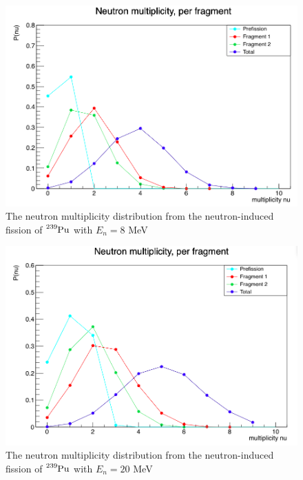 \documentclass[]{article}
\begin{document}
\begin{figure} [H]
	\centering
	\includegraphics[scale=0.36]{Pu239_8_n_mult.png}
	\caption{The neutron multiplicity distribution from the neutron-induced fission of $\ce{^{239}Pu}$ with $E_n = 8$ MeV}
	\label{fig:Pu239_8_n_mult}
\end{figure}

\begin{figure} [H]
	\centering
	\includegraphics[scale=0.36]{Pu239_20_n_mult.png}
	\caption{The neutron multiplicity distribution from the neutron-induced fission of $\ce{^{239}Pu}$ with $E_n = 20$ MeV}
	\label{fig:Pu239_20_n_mult}
\end{figure}
\end{document}
